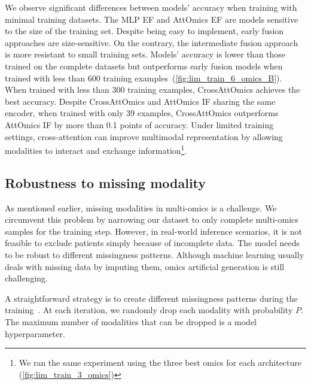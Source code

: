 \documentclass[../main.tex]{subfiles}
\begin{document}
		We observe significant differences between models' accuracy when training with minimal training datasets.
		The MLP EF and AttOmics EF are models sensitive to the size of the training set.
		Despite being easy to implement, early fusion approaches are size-sensitive.
		On the contrary, the intermediate fusion approach is more resistant to small training sets.
		Models' accuracy is lower than those trained on the complete datasets but outperforms early fusion models when trained with less than 600 training examples~(\cref{fig:lim_train_6_omics_B}).
		When trained with less than 300 training examples, CrossAttOmics achieves the best accuracy.
		Despite CrossAttOmics and AttOmics IF sharing the same encoder, when trained with only 39 examples, CrossAttOmics outperforms AttOmics IF by more than 0.1 points of accuracy.
		Under limited training settings, cross-attention can improve multimodal representation by allowing modalities to interact and exchange information\footnote{We ran the same experiment using the three best omics for each architecture (\cref{fig:lim_train_3_omics})}.

	\subsection{Robustness to missing modality}
		As mentioned earlier, missing modalities in multi-omics is a challenge.
		We circumvent this problem by narrowing our dataset to only complete multi-omics samples for the training step.
		However, in real-world inference scenarios, it is not feasible to exclude patients simply because of incomplete data.
		The model needs to be robust to different missingness patterns.
		Although machine learning usually deals with missing data by imputing them, omics artificial generation is still challenging.

		A straightforward strategy is to create different missingness patterns during the training~\cite{Cheerla2019}.
		At each iteration, we randomly drop each modality with probability \(P\).
		The maximum number of modalities that can be dropped is a model hyperparameter.\pagebreak
\end{document}
